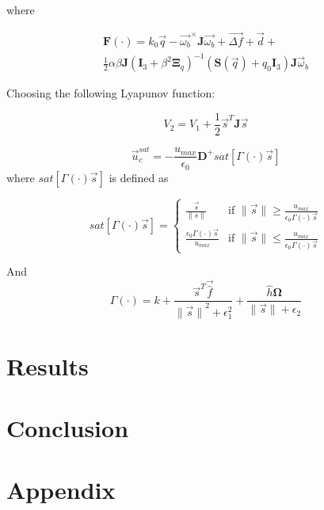 where

\begin{multline}
    \mathbf{F}(\cdot)=k_0\vec{q}-\vec{\omega_b}^{\times}\mathbf{J}\vec{\omega_b}+\vec{\Delta f} + \vec{d} + \\
    \frac{1}{2}\alpha\beta\mathbf{J}(\mathbf{I}_3+\beta^2\mathbf{\Xi}_q)^{-1}(\mathbf{S}(\vec{q})+q_0\mathbf{I}_3)\mathbf{J}\vec{\omega}_{b}
\end{multline}

Choosing the following Lyapunov function: 

\begin{equation}
    V_2=V_1+\frac{1}{2}\vec{s}^T\mathbf{J}\vec{s}
\end{equation}


\begin{equation}
\vec{u}^{sat}_{c} = -\frac{u_{max}}{\epsilon_{0}}\mathbf{D}^+ sat[\Gamma(\cdot)\vec{s}]
\end{equation}
where $sat[\Gamma(\cdot)\vec{s}]$ is defined as

\begin{equation}
    sat[\Gamma(\cdot)\vec{s}]=\begin{cases}
        \frac{\vec{s}}{\lVert s \rVert} & \text{if } \lVert \vec{s} \rVert \geq \frac{u_{max}}{\epsilon_0\Gamma(\cdot)\vec{s}}\\
        \frac{\epsilon_0\Gamma(\cdot)\vec{s}}{u_{max}} & \text{if } \lVert \vec{s} \rVert \leq \frac{u_{max}}{\epsilon_0\Gamma(\cdot)\vec{s}}
    \end{cases}
\end{equation}

And 
\begin{equation}
\Gamma(\cdot)=k+\frac{\vec{s}^T\vec{\hat{f}}}{{\lVert \vec{s} \rVert}^2+\epsilon_{1}^2}+ 
\frac{\hat{h}\mathbf{\Omega}}{\lVert \vec{s} \rVert + \epsilon_{2}}
\end{equation}


\section{Results}

\section{Conclusion}

\section{Appendix}
